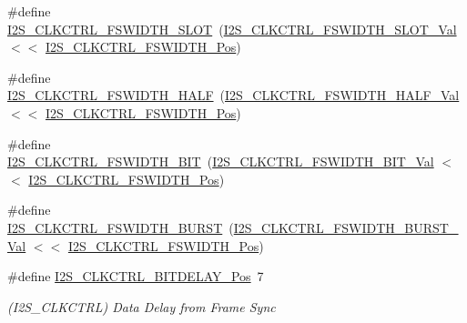 \begin{DoxyCompactItemize}
\#define \mbox{\hyperlink{group___s_a_m_d21___i2_s_ga9c4c5a0dffa25c33d832bbbc29694647}{I2\+S\+\_\+\+C\+L\+K\+C\+T\+R\+L\+\_\+\+F\+S\+W\+I\+D\+T\+H\+\_\+\+S\+L\+OT}}~(\mbox{\hyperlink{group___s_a_m_d21___i2_s_ga95aeb939939817f4a06c2b7fad0baf11}{I2\+S\+\_\+\+C\+L\+K\+C\+T\+R\+L\+\_\+\+F\+S\+W\+I\+D\+T\+H\+\_\+\+S\+L\+O\+T\+\_\+\+Val}}  $<$$<$ \mbox{\hyperlink{group___s_a_m_d21___i2_s_ga68fd7a78e998d738a74bf6a56a47a082}{I2\+S\+\_\+\+C\+L\+K\+C\+T\+R\+L\+\_\+\+F\+S\+W\+I\+D\+T\+H\+\_\+\+Pos}})
\item 
\#define \mbox{\hyperlink{group___s_a_m_d21___i2_s_ga1818a7168e3c4b0cfee3f478c819ce18}{I2\+S\+\_\+\+C\+L\+K\+C\+T\+R\+L\+\_\+\+F\+S\+W\+I\+D\+T\+H\+\_\+\+H\+A\+LF}}~(\mbox{\hyperlink{group___s_a_m_d21___i2_s_ga74f044f2df267ca85a29fea55b94cd7b}{I2\+S\+\_\+\+C\+L\+K\+C\+T\+R\+L\+\_\+\+F\+S\+W\+I\+D\+T\+H\+\_\+\+H\+A\+L\+F\+\_\+\+Val}}  $<$$<$ \mbox{\hyperlink{group___s_a_m_d21___i2_s_ga68fd7a78e998d738a74bf6a56a47a082}{I2\+S\+\_\+\+C\+L\+K\+C\+T\+R\+L\+\_\+\+F\+S\+W\+I\+D\+T\+H\+\_\+\+Pos}})
\item 
\#define \mbox{\hyperlink{group___s_a_m_d21___i2_s_gadf1a62e89e9b168b0a41ee8546d20e58}{I2\+S\+\_\+\+C\+L\+K\+C\+T\+R\+L\+\_\+\+F\+S\+W\+I\+D\+T\+H\+\_\+\+B\+IT}}~(\mbox{\hyperlink{group___s_a_m_d21___i2_s_ga8e586922105865e834930dfc922c1671}{I2\+S\+\_\+\+C\+L\+K\+C\+T\+R\+L\+\_\+\+F\+S\+W\+I\+D\+T\+H\+\_\+\+B\+I\+T\+\_\+\+Val}}   $<$$<$ \mbox{\hyperlink{group___s_a_m_d21___i2_s_ga68fd7a78e998d738a74bf6a56a47a082}{I2\+S\+\_\+\+C\+L\+K\+C\+T\+R\+L\+\_\+\+F\+S\+W\+I\+D\+T\+H\+\_\+\+Pos}})
\item 
\#define \mbox{\hyperlink{group___s_a_m_d21___i2_s_ga804d973398548f1cf459dde59bf12022}{I2\+S\+\_\+\+C\+L\+K\+C\+T\+R\+L\+\_\+\+F\+S\+W\+I\+D\+T\+H\+\_\+\+B\+U\+R\+ST}}~(\mbox{\hyperlink{group___s_a_m_d21___i2_s_gad8a9cb5d05e25833a45f099860ac162e}{I2\+S\+\_\+\+C\+L\+K\+C\+T\+R\+L\+\_\+\+F\+S\+W\+I\+D\+T\+H\+\_\+\+B\+U\+R\+S\+T\+\_\+\+Val}} $<$$<$ \mbox{\hyperlink{group___s_a_m_d21___i2_s_ga68fd7a78e998d738a74bf6a56a47a082}{I2\+S\+\_\+\+C\+L\+K\+C\+T\+R\+L\+\_\+\+F\+S\+W\+I\+D\+T\+H\+\_\+\+Pos}})
\item 
\#define \mbox{\hyperlink{group___s_a_m_d21___i2_s_ga49490bb9926136b0a51f72cf1cb06d0b}{I2\+S\+\_\+\+C\+L\+K\+C\+T\+R\+L\+\_\+\+B\+I\+T\+D\+E\+L\+A\+Y\+\_\+\+Pos}}~7
\begin{DoxyCompactList}\small\item\em (I2\+S\+\_\+\+C\+L\+K\+C\+T\+RL) Data Delay from Frame Sync \end{DoxyCompactList}\item 

\end{DoxyCompactItemize}
